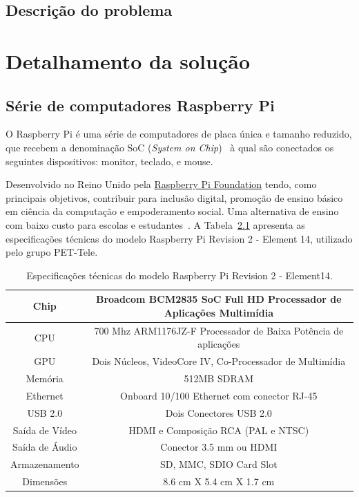 \documentclass[12pt,a4paper,oneside]{book}
\begin{document}
\section{Descrição do problema}


%
\chapter{Detalhamento da solução}
%
\thispagestyle{empty} 
%


\section {Série de computadores Raspberry Pi}
%
O Raspberry Pi é uma série de computadores de placa única e tamanho reduzido, que recebem a denominação  SoC (\textit{System on Chip})~\cite{url:soc} à qual são conectados os seguintes dispositivos: monitor, teclado, e mouse. 

Desenvolvido no Reino Unido pela \href{https://www.raspberrypi.org/}{Raspberry Pi Foundation} tendo, como principais objetivos, contribuir para inclusão digital, promoção de ensino básico em ciência da computação e empoderamento social. Uma alternativa de ensino com baixo custo para escolas e estudantes~\cite{url:raspberry_wiki}. A Tabela~\ref{tab:Especificacoes} apresenta as especificações técnicas do modelo Raspberry Pi Revision 2 - Element 14, utilizado pelo grupo PET-Tele. 
%
\begin{table}[!htbp]
    \centering
    \begin{tabular}{ |c|c| } 
        \hline
        Chip & Broadcom BCM2835 SoC Full HD Processador de Aplicações Multimídia\\
        \hline
        CPU & 700 Mhz ARM1176JZ-F Processador de Baixa Potência de aplicações \\
        \hline
        GPU & Dois Núcleos, VideoCore IV, Co-Processador de Multimídia \\ 
        \hline
        Memória & 512MB SDRAM  \\
        \hline
        Ethernet & Onboard 10/100 Ethernet com conector RJ-45 \\
        \hline
        USB 2.0 & Dois Conectores USB 2.0 \\ 
        \hline
        Saída de Vídeo & HDMI e Composição RCA (PAL e NTSC) \\ 
        \hline
        Saída de Áudio & Conector 3.5 mm ou HDMI \\
        \hline
        Armazenamento & SD, MMC, SDIO Card Slot \\
        \hline
        Dimensões & 8.6 cm X 5.4 cm X 1.7 cm \\ 
        \hline
    \end{tabular}
    \caption{Especificações técnicas do modelo Raspberry Pi Revision 2 - Element14.}
    \label{tab:Especificacoes}
\end{table}
\end{document}
